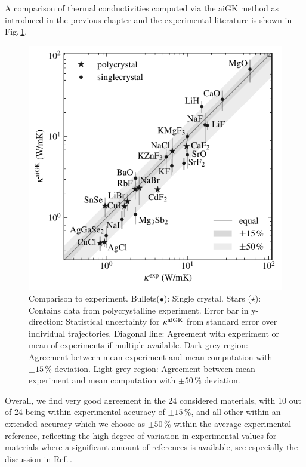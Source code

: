 A comparison of thermal conductivities computed via the aiGK method as introduced in the previous chapter and the experimental literature is shown in Fig.\,\ref{fig:kappa_exp}.
%
\begin{figure}
	\includegraphics[width=\textwidth]{./data/plots/kappa_vs_exp_trusted/kappa_vs_exp_corrected_annotated.pdf}
	\caption{Comparison to experiment. Bullets($\bullet$): Single crystal. Stars ($\star$): Contains data from polycrystalline experiment. Error bar in y-direction: Statistical uncertainty for $\kappa^{\rm aiGK}$ from standard error over individual trajectories. Diagonal line: Agreement with experiment or mean of experiments if multiple available. Dark grey region: Agreement between mean experiment and mean computation with $\pm 15\,\%$ deviation. Light grey region: Agreement between mean experiment and mean computation with $\pm 50\,\%$ deviation.}
	\label{fig:kappa_exp}
\end{figure}
%
Overall, we find very good agreement in the 24 considered materials, with 10 out of 24 being within experimental accuracy of $\pm 15\,\%$, and all other within an extended %
accuracy which we choose as $\pm 50\,\%$ within the average experimental reference, reflecting the high degree of variation in experimental values for materials where a significant amount of references is available, see especially the discussion in Ref.\,\cite{Wei.2016}. 

